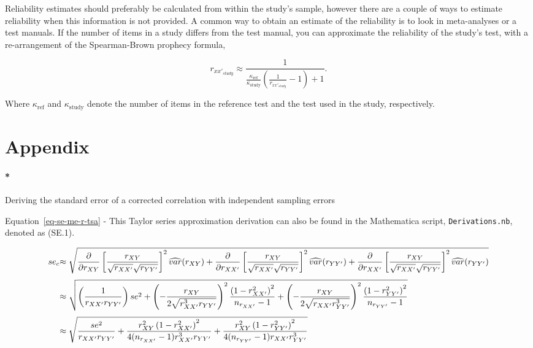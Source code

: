 \documentclass[
  letterpaper,
  DIV=11,
  numbers=noendperiod]{scrreprt}
\let\oldparagraph\paragraph
\renewcommand{\paragraph}[1]{\oldparagraph{#1}\mbox{}}
\begin{document}
Reliability estimates should preferably be calculated from within the
study's sample, however there are a couple of ways to estimate
reliability when this information is not provided. A common way to
obtain an estimate of the reliability is to look in meta-analyses or a
test manuals. If the number of items in a study differs from the test
manual, you can approximate the reliability of the study's test, with a
re-arrangement of the Spearman-Brown prophecy formula,

\[
r_{xx'_{study}} \approx \frac{1}{\frac{\kappa_{\text{ref}}}{\kappa_{\text{study}}} \left(\frac{1}{r_{xx'_{study}}} - 1\right) + 1}. 
\]

Where \(\kappa_{\text{ref}}\) and \(\kappa_{\text{study}}\) denote the
number of items in the reference test and the test used in the study,
respectively.

\hypertarget{appendix}{%
\section{Appendix}\label{appendix}}

\hypertarget{deriving-the-standard-error-of-a-corrected-correlation-with-independent-sampling-errors}{%
\paragraph*{Deriving the standard error of a corrected correlation with
independent sampling
errors}\label{deriving-the-standard-error-of-a-corrected-correlation-with-independent-sampling-errors}}

Equation~\ref{eq-se-me-r-tsa} - This Taylor series approximation
derivation can also be found in the Mathematica script,
\texttt{Derivations.nb}, denoted as (SE.1).

\[\begin{aligned}
\tiny{se_c} &\tiny{\approx \sqrt{\frac{\partial}{\partial r_{XY}}\left[\frac{r_{XY}}{\sqrt{r_{XX'}}\sqrt{r_{YY'}}}\right]^2 \widehat{var}(r_{XY}) + \frac{\partial}{\partial r_{XX'}}\left[\frac{r_{XY}}{\sqrt{r_{XX'}}\sqrt{r_{YY'}}}\right]^2  \widehat{var}(r_{YY'}) + \frac{\partial}{\partial r_{XX'}}\left[\frac{r_{XY}}{\sqrt{r_{XX'}}\sqrt{r_{YY'}}}\right]^2 \widehat{var}(r_{YY'})}}\\[.3em]
&\tiny{\approx \sqrt{ \left(\frac{1}{r_{XX'}r_{YY'}}\right) se^2 + \left( -\frac{r_{XY}}{2\sqrt{r_{XX'}^3r_{YY'}}} \right)^2\frac{\left(1-r^2_{XX'}\right)^2}{n_{r_{XX'}}-1}+  \left(  -\frac{r_{XY}}{2\sqrt{r_{XX'}r_{YY'}^3}} \right)^2\frac{\left(1-r^2_{YY'}\right)^2}{n_{r_{YY'}}-1}}}\\[.3em]
&\tiny{\approx \sqrt{\frac{se^2}{r_{XX'}r_{YY'}} + 
\frac{r^2_{XY}\left(1-r^2_{XX'}\right)^2}{4(n_{r_{XX'}}-1)r_{XX'}^3r_{YY'}} + 
\frac{r^2_{XY}\left(1-r^2_{YY'}\right)^2}{4(n_{r_{YY'}}-1)r_{XX'}r_{YY'}^3}}}
\end{aligned}\]
\end{document}
